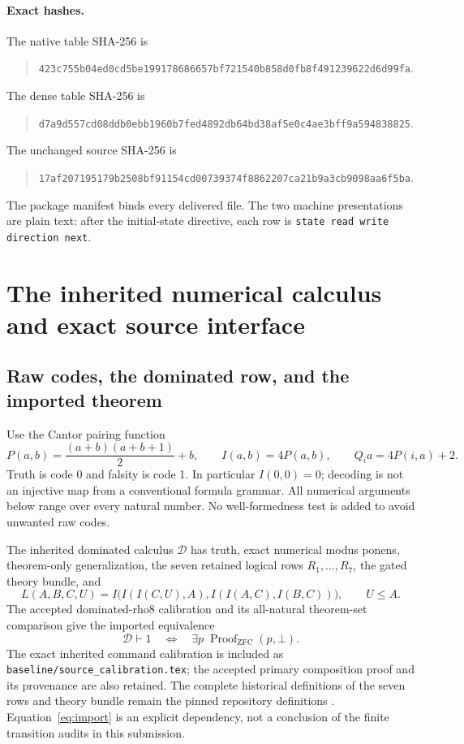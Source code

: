 \documentclass[11pt,letterpaper]{article}
\theoremstyle{definition}
\newcommand{\ZFC}{\mathrm{ZFC}}
\newcommand{\CalD}{\mathcal D}
\newcommand{\pathfile}[1]{\texttt{\nolinkurl{#1}}}
\begin{document}
\paragraph{Exact hashes.}
The native table SHA-256 is
\begin{quote}\small\ttfamily
\nolinkurl{423c755b04ed0cd5be199178686657bf721540b858d0fb8f491239622d6d99fa}.
\end{quote}
The dense table SHA-256 is
\begin{quote}\small\ttfamily
\nolinkurl{d7a9d557cd08ddb0ebb1960b7fed4892db64bd38af5e0c4ae3bff9a594838825}.
\end{quote}
The unchanged source SHA-256 is
\begin{quote}\small\ttfamily
\nolinkurl{17af207195179b2508bf91154cd00739374f8862207ca21b9a3cb9098aa6f5ba}.
\end{quote}
The package manifest binds every delivered file.  The two machine
presentations are plain text: after the initial-state directive, each
row is \pathfile{state read write direction next}.



\section{The inherited numerical calculus and exact source interface}
\label{sec:calculus}

\subsection{Raw codes, the dominated row, and the imported theorem}

Use the Cantor pairing function
\[
 P(a,b)=\frac{(a+b)(a+b+1)}2+b,
 \qquad I(a,b)=4P(a,b),\qquad Q_i a=4P(i,a)+2.
\]
Truth is code 0 and falsity is code 1.  In particular $I(0,0)=0$;
decoding is not an injective map from a conventional formula grammar.
All numerical arguments below range over every natural number.
No well-formedness test is added to avoid unwanted raw codes.

The inherited dominated calculus $\CalD$ has truth, exact numerical
modus ponens, theorem-only generalization, the seven retained logical
rows $R_1,\ldots,R_7$, the gated theory bundle, and
\[
 L(A,B,C,U)=
 I\bigl(I(I(C,U),A),I(I(A,C),I(B,C))\bigr),\qquad U\le A.
\]
The accepted dominated-rho8 calibration and its all-natural theorem-set
comparison give the imported equivalence
\begin{equation}
 \CalD\vdash1\quad\Longleftrightarrow\quad
 \exists p\;\operatorname{Proof}_{\ZFC}(p,\bot).
 \label{eq:import}
\end{equation}
The exact inherited command calibration is included as
\pathfile{baseline/source_calibration.tex}; the accepted primary
composition proof and its provenance are also retained.  The complete
historical definitions of the seven rows and theory bundle remain the
pinned repository definitions \cite{dominated,permuted}.
Equation~\eqref{eq:import} is an explicit dependency, not a conclusion
of the finite transition audits in this submission.
\end{document}
